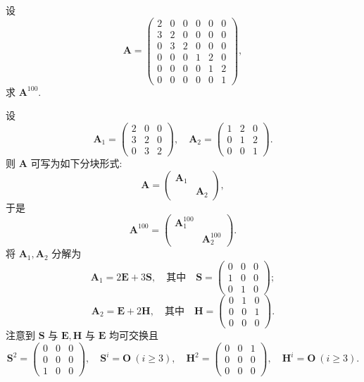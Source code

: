 \documentclass[../../main.tex]{subfiles}%
\begin{document}
\begin{example}
设
\[
\boldsymbol{A} = \begin{pmatrix} 2 & 0 & 0 & 0 & 0 & 0 \\ 3 & 2 & 0 & 0 & 0 & 0 \\ 0 & 3 & 2 & 0 & 0 & 0 \\ 0 & 0 & 0 & 1 & 2 & 0 \\ 0 & 0 & 0 & 0 & 1 & 2 \\ 0 & 0 & 0 & 0 & 0 & 1 \end{pmatrix},
\]
求 \(\boldsymbol{A}^{100}\).
\end{example}
\begin{solution}
设
\[
\boldsymbol{A}_1 = \begin{pmatrix} 2 & 0 & 0 \\ 3 & 2 & 0 \\ 0 & 3 & 2 \end{pmatrix}, \quad \boldsymbol{A}_2 = \begin{pmatrix} 1 & 2 & 0 \\ 0 & 1 & 2 \\ 0 & 0 & 1 \end{pmatrix}.
\]
则 \(\boldsymbol{A}\) 可写为如下分块形式:
\[
\boldsymbol{A} = \begin{pmatrix} \boldsymbol{A}_1 &  \\  & \boldsymbol{A}_2 \end{pmatrix},
\]
于是
\[
\boldsymbol{A}^{100} = \begin{pmatrix} \boldsymbol{A}_1^{100} &  \\  & \boldsymbol{A}_2^{100} \end{pmatrix}.
\]
将 \(\boldsymbol{A}_1, \boldsymbol{A}_2\) 分解为
\[
\boldsymbol{A}_1 = 2\boldsymbol{E} + 3\boldsymbol{S}, \quad \text{其中} \quad \boldsymbol{S} = \begin{pmatrix} 0 & 0 & 0 \\ 1 & 0 & 0 \\ 0 & 1 & 0 \end{pmatrix};
\]
\[
\boldsymbol{A}_2 = \boldsymbol{E} + 2\boldsymbol{H}, \quad \text{其中} \quad \boldsymbol{H} = \begin{pmatrix} 0 & 1 & 0 \\ 0 & 0 & 1 \\ 0 & 0 & 0 \end{pmatrix}.
\]
注意到 \(\boldsymbol{S}\) 与 \(\boldsymbol{E}, \boldsymbol{H}\) 与 \(\boldsymbol{E}\) 均可交换且
\[
\boldsymbol{S}^2 = \begin{pmatrix} 0 & 0 & 0 \\ 0 & 0 & 0 \\ 1 & 0 & 0 \end{pmatrix}, \quad \boldsymbol{S}^i = \boldsymbol{O} \ (i \geqslant 3), \quad \boldsymbol{H}^2 = \begin{pmatrix} 0 & 0 & 1 \\ 0 & 0 & 0 \\ 0 & 0 & 0 \end{pmatrix}, \quad \boldsymbol{H}^i = \boldsymbol{O} \ (i \geqslant 3).
\]
\end{solution}
\end{document}
